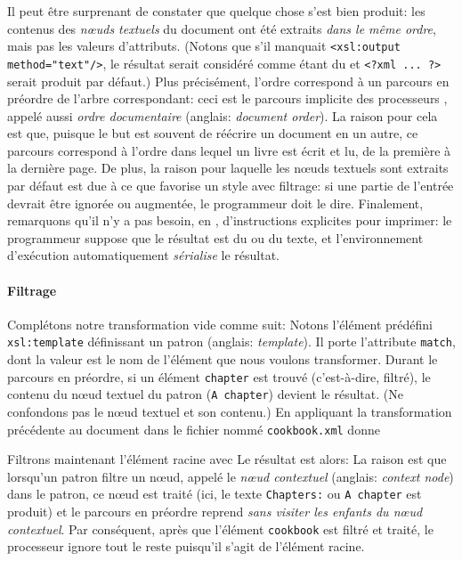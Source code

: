 Il peut être surprenant de constater que quelque chose s'est bien
produit: les contenus des \emph{nœuds textuels} du document \XML
ont été extraits \emph{dans le même ordre}, mais pas les valeurs
d'attributs. (Notons que s'il manquait
\verb|<xsl:output method="text"/>|, le résultat serait considéré comme
étant du \XML et \verb|<?xml ... ?>| serait produit par défaut.) Plus
précisément, l'ordre correspond à un parcours en préordre de l'arbre
\XML correspondant: ceci est le parcours implicite des processeurs
\XSLT, appelé aussi \emph{ordre documentaire} (anglais: \emph{document
  order}). La raison pour cela est que, puisque le but est souvent de
réécrire un document en un autre, ce parcours correspond à l'ordre
dans lequel un livre est écrit et lu, de la première à la dernière
page. De plus, la raison pour laquelle les nœuds textuels sont
extraits par défaut est due à ce que \XSLT favorise un style avec
filtrage: si une partie de l'entrée devrait être ignorée ou augmentée,
le programmeur doit le dire. Finalement, remarquons qu'il n'y a pas
besoin, en \XSLT, d'instructions explicites pour imprimer: le
programmeur suppose que le résultat est du \XML ou du texte, et
l'environnement d'exécution automatiquement \emph{sérialise} le
résultat.

\paragraph{Filtrage}
\label{par:matching}

Complétons notre transformation vide comme suit:
\noindent Notons l'élément prédéfini \texttt{xsl:template} définissant
un patron (anglais: \emph{template}). Il porte l'attribute
\texttt{match}, dont la valeur est le nom de l'élément que nous
voulons transformer. Durant le parcours en préordre, si un élément
\texttt{chapter} est trouvé (c'est-à-dire, filtré), le contenu du
nœud textuel du patron (\texttt{A chapter}) devient le
résultat. (Ne confondons pas le nœud textuel et son contenu.) En
appliquant la transformation précédente au document
dans le fichier nommé \texttt{cookbook.xml} donne

\noindent Filtrons maintenant l'élément racine avec
\noindent Le résultat est alors:
\noindent La raison est que lorsqu'un patron filtre un nœud,
appelé le \emph{nœud contextuel} (anglais: \emph{context node})
dans le patron, ce nœud est traité (ici, le texte
\texttt{Chapters:} ou \texttt{A chapter} est produit) et le parcours
en préordre reprend \emph{sans visiter les enfants du nœud
  contextuel}. Par conséquent, après que l'élément \texttt{cookbook}
est filtré et traité, le processeur \XSLT ignore tout le reste
puisqu'il s'agit de l'élément racine.

